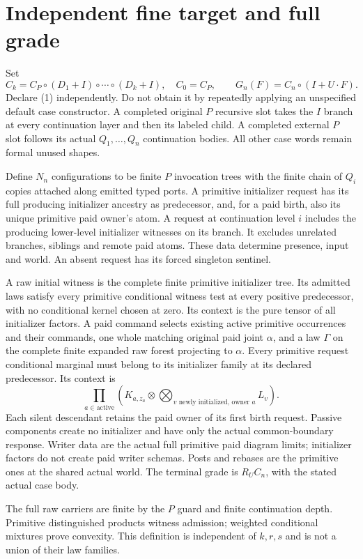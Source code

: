 \documentclass[11pt]{article}\usepackage{amsmath,amssymb,amsthm,geometry}\geometry{margin=1in}\newtheorem{definition}{Definition}\newtheorem{theorem}[definition]{Theorem}
\begin{document}
\section{Independent fine target and full grade}
Set
\[
 C_k=C_P\circ(D_1+I)\circ\cdots\circ(D_k+I),\quad C_0=C_P,
 \qquad G_n(F)=C_n\circ(I+U\cdot F).                 \tag{1}
\]
Declare (1) independently. Do not obtain it by repeatedly applying an unspecified default case constructor. A completed original $P$ recursive slot takes the $I$ branch at every continuation layer and then its labeled child. A completed external $P$ slot follows its actual $Q_1,\ldots,Q_n$ continuation bodies. All other case words remain formal unused shapes.

Define $N_n$ configurations to be finite $P$ invocation trees with the finite chain of $Q_i$ copies attached along emitted typed ports. A primitive initializer request has its full producing initializer ancestry as predecessor, and, for a paid birth, also its unique primitive paid owner's atom. A request at continuation level $i$ includes the producing lower-level initializer witnesses on its branch. It excludes unrelated branches, siblings and remote paid atoms. These data determine presence, input and world. An absent request has its forced singleton sentinel.

A raw initial witness is the complete finite primitive initializer tree. Its admitted laws satisfy every primitive conditional witness test at every positive predecessor, with no conditional kernel chosen at zero. Its context is the pure tensor of all initializer factors. A paid command selects existing active primitive occurrences and their commands, one whole matching original paid joint $\alpha$, and a law $\Gamma$ on the complete finite expanded raw forest projecting to $\alpha$. Every primitive request conditional marginal must belong to its initializer family at its declared predecessor. Its context is
\[
 \prod_{a\in\mathrm{active}}
    \left(K_{a,z_a}\otimes\bigotimes_{v\text{ newly initialized, owner }a}L_v\right). \tag{2}
\]
Each silent descendant retains the paid owner of its first birth request. Passive components create no initializer and have only the actual common-boundary response. Writer data are the actual full primitive paid diagram limits; initializer factors do not create paid writer schemas. Posts and rebases are the primitive ones at the shared actual world. The terminal grade is $R_UC_n$, with the stated actual case body.

The full raw carriers are finite by the $P$ guard and finite continuation depth. Primitive distinguished products witness admission; weighted conditional mixtures prove convexity. This definition is independent of $k,r,s$ and is not a union of their law families.
\end{document}
